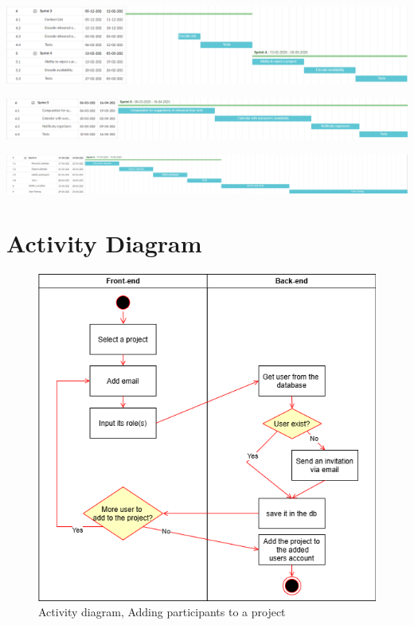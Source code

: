 \documentclass[11pt]{article}
\begin{document}
\vspace{1cm}
\hspace{-1.5cm}
\includegraphics[scale=0.75]{g3.png} 

\vspace{1cm}
\hspace{-1.5cm}
\includegraphics[scale=0.71]{g4.png} 

\vspace{1cm}
\hspace{-1.5cm}
\includegraphics[scale=0.5]{g5.png} 


\vspace{1.5cm}

\section{Activity Diagram}

\begin{figure}[htbp!]
    \centering
    \includegraphics[scale=0.5]{addingusers.drawio.png}
    \caption{Activity diagram, Adding participants to a project}
\end{figure}
\end{document}
